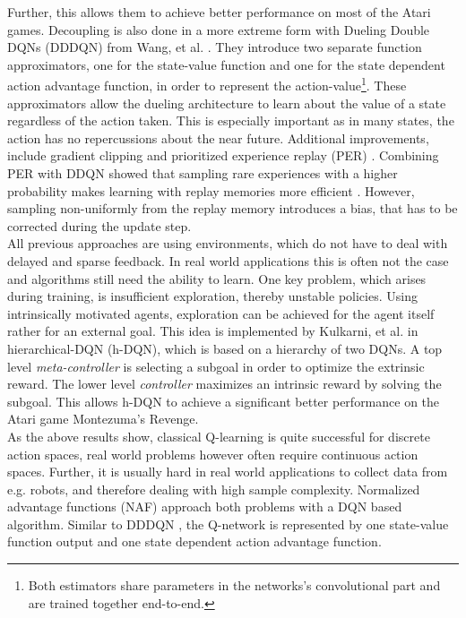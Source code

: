 		Further, this allows them to achieve better performance on most of the Atari games. 
		Decoupling is also done in a more extreme form with Dueling Double DQNs (DDDQN) from Wang, et al. \cite{Wang2016}. 
		They introduce two separate function approximators, one for the state-value function and one for the state dependent action advantage function, in order to represent the action-value\footnote{Both estimators share parameters in the networks's convolutional part and are trained together end-to-end.}.
		These approximators allow the dueling architecture to learn about the value of a state regardless of the action taken. 
		This is especially important as in many states, the action has no repercussions about the near future. 
		Additional improvements, include gradient clipping and prioritized experience replay (PER) \cite{Schaul2015}.
		Combining PER with DDQN \cite{Schaul2015} showed that sampling rare experiences with a higher probability makes learning with replay memories more efficient \cite{Lin1992}. 
		However, sampling non-uniformly from the replay memory introduces a bias, that has to be corrected during the update step.\\
		All previous approaches are using environments, which do not have to deal with delayed and sparse feedback.
		In real world applications this is often not the case and algorithms still need the ability to learn.
		One key problem, which arises during training, is insufficient exploration, thereby unstable policies. 
		Using intrinsically motivated agents, exploration can be achieved for the agent itself rather for an external goal. 
		This idea is implemented by Kulkarni, et al. \cite{Kulkarni2016} in hierarchical-DQN (h-DQN), which is based on a hierarchy of two DQNs.
		A top level \textit{meta-controller} is selecting a subgoal in order to optimize the extrinsic reward.
		The lower level \textit{controller} maximizes an intrinsic reward by solving the subgoal.
		This allows h-DQN to achieve a significant better performance on the Atari game Montezuma's Revenge.\\
		As the above results show, classical Q-learning \cite{Watkins1989} is quite successful for discrete action spaces, real world problems however often require continuous action spaces.
		Further, it is usually hard in real world applications to collect data from e.g. robots, and therefore dealing with high sample complexity.
		Normalized advantage functions (NAF) \cite{Gu2016} approach both problems with a DQN based algorithm.
		Similar to DDDQN \cite{Wang2016}, the Q-network is represented by one state-value function output and one state dependent action advantage function.
